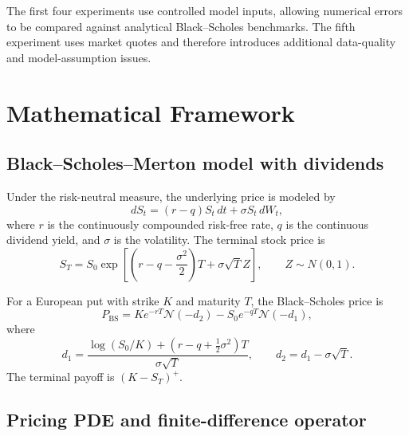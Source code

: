 \documentclass[11pt,a4paper]{article}
\newcommand{\Ncdf}{\mathcal{N}}
\begin{document}
The first four experiments use controlled model inputs, allowing numerical errors to be compared against analytical Black--Scholes benchmarks. The fifth experiment uses market quotes and therefore introduces additional data-quality and model-assumption issues.

\section{Mathematical Framework}

\subsection{Black--Scholes--Merton model with dividends}

Under the risk-neutral measure, the underlying price is modeled by
\begin{equation}
  dS_t=(r-q)S_t\,dt+\sigma S_t\,dW_t,
  \label{eq:gbm}
\end{equation}
where $r$ is the continuously compounded risk-free rate, $q$ is the continuous dividend yield, and $\sigma$ is the volatility. The terminal stock price is
\begin{equation}
  S_T=S_0\exp\left[\left(r-q-\frac{\sigma^2}{2}\right)T
  +\sigma\sqrt{T}Z\right],\qquad Z\sim N(0,1).
\end{equation}

For a European put with strike $K$ and maturity $T$, the Black--Scholes price is
\begin{equation}
  P_{\mathrm{BS}}=Ke^{-rT}\Ncdf(-d_2)-S_0e^{-qT}\Ncdf(-d_1),
  \label{eq:bsput}
\end{equation}
where
\begin{equation}
  d_1=\frac{\log(S_0/K)+(r-q+\frac12\sigma^2)T}{\sigma\sqrt{T}},
  \qquad d_2=d_1-\sigma\sqrt{T}.
\end{equation}
The terminal payoff is $(K-S_T)^+$.

\subsection{Pricing PDE and finite-difference operator}
\end{document}
